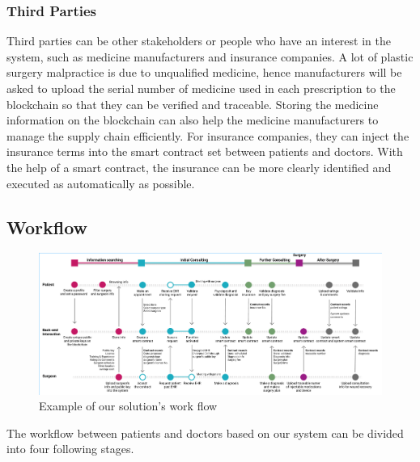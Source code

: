 \documentclass{article}
\begin{document}
\subsubsection{Third Parties}
Third parties can be other stakeholders or people who have an interest in the system, such as medicine manufacturers and insurance companies. A lot of plastic surgery malpractice is due to unqualified medicine, hence manufacturers will be asked to upload the serial number of medicine used in each prescription to the blockchain so that they can be verified and traceable. Storing the medicine information on the blockchain can also help the medicine manufacturers to manage the supply chain efficiently. For insurance companies, they can inject the insurance terms into the smart contract set between patients and doctors. With the help of a smart contract, the insurance can be more clearly identified and executed as automatically as possible.
\subsection{Workflow}
\begin{figure}[H]
    \centering
    \includegraphics[scale=0.5]{Workflow.jpg}
    \caption{Example of our solution's work flow}
\end{figure}
The workflow between patients and doctors based on our system can be divided into four following stages.
\end{document}
